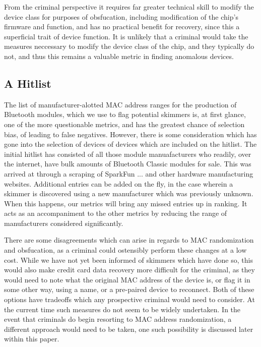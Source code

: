From the criminal perspective it requires far greater technical skill to modify the device
class for purposes of obsfucation, including modification of the chip's firmware and function,
and has no practical benefit for recovery, since this a superficial trait of device function.
It is unlikely that a criminal would take the measures neccessary to modify the device class
of the chip, and they typically do not, and thus this remains a valuable metric in finding
anomalous devices.

\subsection{A Hitlist}

The list of manufacturer-alotted MAC address ranges for the production of Bluetooth modules,
which we use to flag potential skimmers is, at first glance, one of the more questionable
metrics, and has the greatest chance of selection bias, of leading to false negatives.
However, there is some consideration which has gone into the selection of devices of devices
which are included on the hitlist. The initial hitlist has consisted of all those module
manuafacturers who readily, over the internet, have bulk amounts of Bluetooth Classic modules
for sale. This was arrived at through a scraping of SparkFun ... and other hardware
manufacturing websites. Additional entries can be added on the fly, in the case wherein a
skimmer is discovered using a new manufacturer which was previously unknown. When this happens,
our metrics will bring any missed entries up in ranking. It acts as an accompaniment to the
other metrics by reducing the range of manufacturers considered significantly.

There are some disagreements which can arise in regards to MAC randomization and obsfucation, as
a criminal could ostensibly perform these changes at a  low cost. While we have not yet been
informed of skimmers which have done so, this would also make credit card data recovery more
difficult for the criminal, as they would need to note what the original MAC address of the
device is, or flag it in some other way, using a name, or a pre-paired device to reconnect. Both
of these options have tradeoffs which any prospective criminal would need to consider. At the
current time such measures do not seem to be widely undertaken. In the event that criminals do
begin resorting to MAC address randomization, a different approach would need to be taken, one
such possibility is discussed later within this paper.

